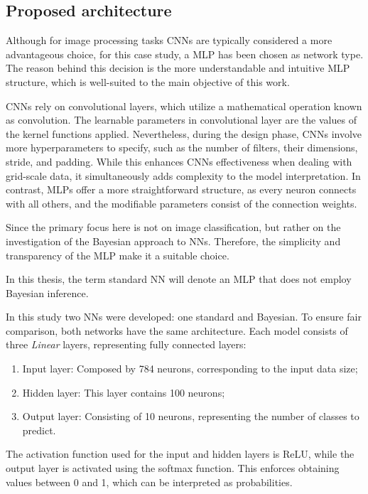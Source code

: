 \subsection{Proposed architecture}

Although for image processing tasks CNNs are typically considered a more advantageous choice, for this case study, a MLP has been chosen as network type. The reason behind this decision is the more understandable and intuitive MLP structure, which is well-suited to the main objective of this work.

CNNs rely on convolutional layers, which utilize a mathematical operation known as convolution. The learnable parameters in convolutional layer are the values of the kernel functions applied. Nevertheless, during the design phase, CNNs involve more hyperparameters to specify, such as the number of filters, their dimensions, stride, and padding. While this enhances CNNs effectiveness when dealing with grid-scale data, it simultaneously adds complexity to the model interpretation. In contrast, MLPs offer a more straightforward structure, as every neuron connects with all others, and the modifiable parameters consist of the connection weights.

Since the primary focus here is not on image classification, but rather on the investigation of the Bayesian approach to NNs. Therefore, the simplicity and transparency of the MLP make it a suitable choice.

In this thesis, the term standard NN will denote an MLP that does not employ Bayesian inference.

In this study two NNs were developed: one standard and Bayesian. To ensure fair comparison, both networks have the same architecture. Each model consists of three \textit{Linear} layers, representing fully connected layers:

\begin{enumerate}
	\item Input layer: Composed by 784 neurons, corresponding to the input data size;
	\item Hidden layer: This layer contains 100 neurons;
	\item Output layer: Consisting of 10 neurons, representing the number of classes to predict.
\end{enumerate}

The activation function used for the input and hidden layers is ReLU, while the output layer is activated using the softmax function. This enforces obtaining values between 0 and 1, which can be interpreted as probabilities.